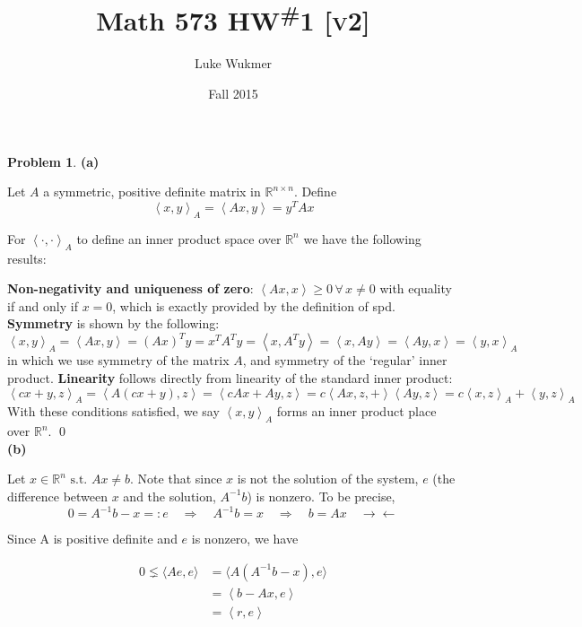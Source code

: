 \documentclass[10pt]{article}
\theoremstyle{plain}
\theoremstyle{definition}
\newtheorem{prob}{Problem}
\providecommand{\R}{\mathbb{R}}%
\numberwithin{equation}{section}
\newcommand\ip[2]{ \left\langle {#1} , {#2} \right\rangle }
\providecommand{\st}{\text{ s.t. }}
\begin{document}
\title{Math 573 HW\textsuperscript{\#}1 \textsc{[v2]}}
\author{Luke Wukmer}
\date{Fall 2015}
\maketitle \thispagestyle{empty} %

%

\begin{prob}
\textbf{(a)}

Let $A$ a symmetric, positive definite matrix in $\R^{ n\times n}$. Define
\[
        \ip{x}{y}_A = \ip{Ax}{y} = y^TAx
    \]

    For $\ip{\cdot}{\cdot}_A$ to define an inner product space over $\R^n$
    we have the following results:

    \textbf{Non-negativity and uniqueness of zero}:
            $\ip{Ax}{x} \geq 0 \,\forall\, x \neq 0$ with equality
            if and only if $x = 0$,
            which is exactly provided by the definition of
            spd.
    \textbf{Symmetry} is shown by the following:
        \[
                \ip{x}{y}_A = \ip{Ax}{y} = (Ax)^Ty = x^T A^T y = \ip{x}{A^Ty} =
                \ip{x}{Ay} = \ip{Ay}{x} = \ip{y}{x}_A
    \]
    in which we use symmetry of the matrix $A$, and symmetry of the `regular'
    inner product. \textbf{Linearity} follows directly from linearity of the standard
    inner product:
    \[
            \ip{cx+y}{z}_A = \ip{A(cx+y)}{z} = \ip{cAx + Ay}{z}
            = c\ip{Ax,z} + \ip{Ay}{z} = c\ip{x}{z}_A + \ip{y}{z}_A
        \]
        With these conditions satisfied, we say $\ip{x}{y}_A$ forms an
        inner product place over $\R^n$. \qed \\
\textbf{(b)}

Let $x \in \R^n \st Ax \neq b$. Note that since $x$ is not the solution of the
system,  $e$ (the difference between $x$ and the
solution, $A^{-1}b$) is nonzero. To be precise,
\[
    0 = A^{-1}b -x =: e \quad \Longrightarrow \quad A^{-1}b = x \quad \Longrightarrow \quad
        b = Ax \quad\rightarrow\leftarrow
\]

Since A is positive definite and $e$ is nonzero, we have

\begin{align*}
        0 \lneq \langle Ae,e \rangle &=
            \langle A \left(A^{-1}b -x \right) , e \rangle \\
                                    &=  \ip{b - Ax}{e} \\
                                    &= \ip{r}{e}
\end{align*}


\end{prob}
\end{document}
